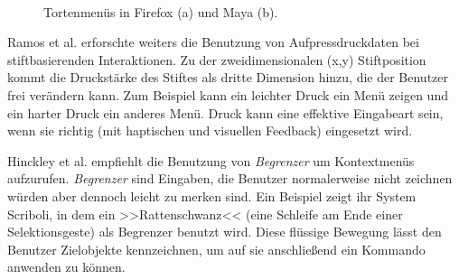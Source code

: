 \begin{figure}
        \myfloatalign
         \quad
         \\
        \caption[Tortenmenüs \newline \citep{Johnson:2009}]{Tortenmenüs in Firefox (a) und Maya (b).}\label{fig:johnsonPieMenu}
\end{figure}

\medskip Ramos et al. \citep{Ramos:2004} erforschte weiters die Benutzung von Aufpressdruckdaten bei stiftbasierenden Interaktionen. Zu der zweidimensionalen (x,y) Stiftposition kommt die Druckstärke des Stiftes als dritte Dimension hinzu, die der Benutzer frei verändern kann. Zum Beispiel kann ein leichter Druck ein Menü zeigen und ein harter Druck ein anderes Menü. Druck kann eine effektive Eingabeart sein, wenn sie richtig (mit haptischen und visuellen Feedback) eingesetzt wird.

\medskip Hinckley et al. \citep{Hinckley:2005} empfiehlt die Benutzung von \emph{Begrenzer} um Kontextmenüs aufzurufen. \emph{Begrenzer} sind Eingaben, die Benutzer normalerweise nicht zeichnen würden aber dennoch leicht zu merken sind. Ein Beispiel zeigt ihr System Scriboli, in dem ein >>Rattenschwanz<< (eine Schleife am Ende einer Selektionsgeste) als Begrenzer benutzt wird. Diese flüssige Bewegung lässt den Benutzer Zielobjekte kennzeichnen, um auf sie anschließend ein Kommando anwenden zu können.

